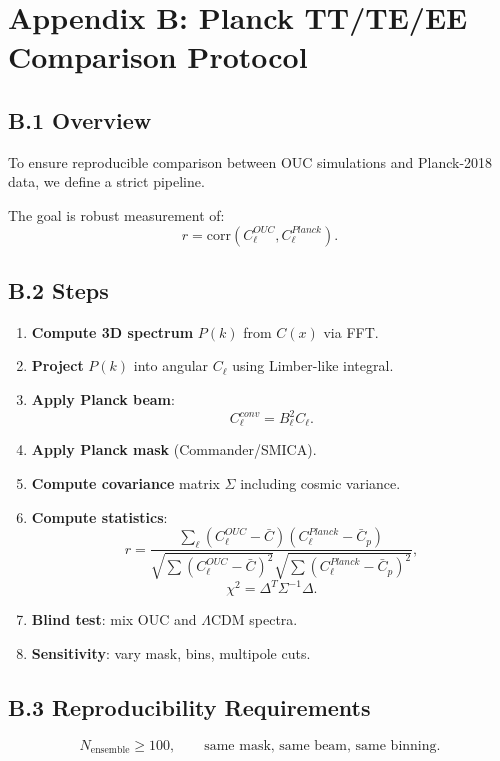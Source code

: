 \section*{Appendix B: Planck TT/TE/EE Comparison Protocol}

\subsection*{B.1 Overview}

To ensure reproducible comparison between OUC simulations and Planck-2018 data, we define a strict pipeline.

The goal is robust measurement of:
\[
r = \mathrm{corr}(C_\ell^{OUC}, C_\ell^{Planck}).
\]

\subsection*{B.2 Steps}

\begin{enumerate}[label=\textbf{B.\arabic*}]
\item \textbf{Compute 3D spectrum} $P(k)$ from $C(x)$ via FFT.
\item \textbf{Project} $P(k)$ into angular $C_\ell$ using Limber-like integral.
\item \textbf{Apply Planck beam}:
\[
C_\ell^{conv} = B_\ell^2 C_\ell.
\]
\item \textbf{Apply Planck mask} (Commander/SMICA).
\item \textbf{Compute covariance} matrix $\Sigma$ including cosmic variance.
\item \textbf{Compute statistics}:
\[
r = 
\frac{\sum_\ell (C_\ell^{OUC}-\bar C)(C_\ell^{Planck}-\bar C_p)}
{\sqrt{\sum (C_\ell^{OUC}-\bar C)^2}\sqrt{\sum (C_\ell^{Planck}-\bar C_p)^2}},
\]
\[
\chi^2 = \Delta^T \Sigma^{-1} \Delta.
\]
\item \textbf{Blind test}: mix OUC and $\Lambda$CDM spectra.
\item \textbf{Sensitivity}: vary mask, bins, multipole cuts.
\end{enumerate}

\subsection*{B.3 Reproducibility Requirements}

\[
N_{\text{ensemble}} \ge 100,
\qquad
\text{same mask, same beam, same binning}.
\]

